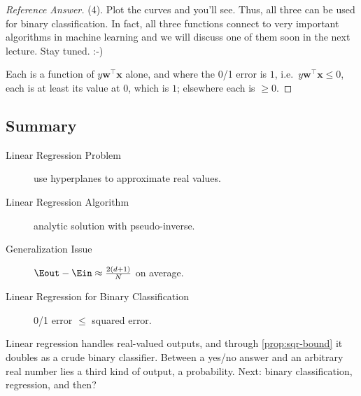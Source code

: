 \begin{proof}[Reference Answer]
    (4). Plot the curves and you'll see. Thus, all three can be used for binary
    classification. In fact, all three functions connect to very important
    algorithms in machine learning and we will discuss one of them soon in the
    next lecture. Stay tuned. :-)
    \begin{center}
    \end{center}
    Each is a function of \(y \bm{w}^\top \bm{x}\) alone, and where the 0/1
    error is \(1\), i.e.\ \(y \bm{w}^\top \bm{x} \le 0\), each is at least its
    value at \(0\), which is \(1\); elsewhere each is \(\ge 0\).
\end{proof}

\hrulebar

\subsection*{Summary}

\begin{description}
    \item[Linear Regression Problem] use hyperplanes to approximate real
        values.
    \item[Linear Regression Algorithm] analytic solution with pseudo-inverse.
    \item[Generalization Issue] \(\Eout - \Ein \approx \frac{2(d+1)}{N}\) on
        average.
    \item[Linear Regression for Binary Classification] 0/1 error \(\le\)
        squared error.
\end{description}

Linear regression handles real-valued outputs, and through
\autoref{prop:sqr-bound} it doubles as a crude binary classifier. Between a
yes/no answer and an arbitrary real number lies a third kind of output, a
probability. Next: binary classification, regression, and then?

